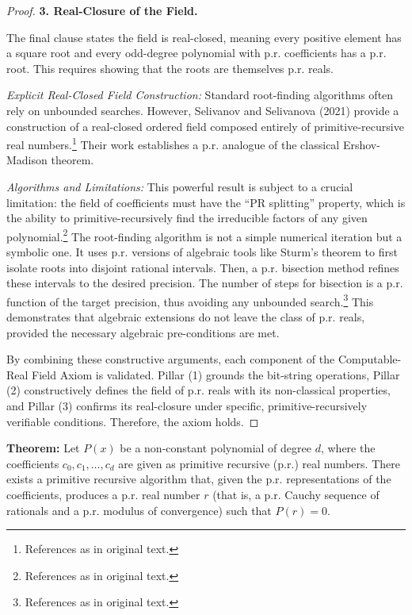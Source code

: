 \documentclass[12pt, a4paper]{article}
\begin{document}
\begin{proof}
\medskip
\noindent \textbf{3. Real-Closure of the Field.}

The final clause states the field is real-closed, meaning every positive element has a square root and every odd-degree polynomial with p.r. coefficients has a p.r. root. This requires showing that the roots are themselves p.r. reals.

\medskip
\noindent \textit{Explicit Real-Closed Field Construction:} Standard root-finding algorithms often rely on unbounded searches. However, Selivanov and Selivanova (2021) provide a construction of a real-closed ordered field composed entirely of primitive-recursive real numbers.\footnote{References as in original text.} Their work establishes a p.r. analogue of the classical Ershov-Madison theorem.

\medskip
\noindent \textit{Algorithms and Limitations:} This powerful result is subject to a crucial limitation: the field of coefficients must have the ``PR splitting'' property, which is the ability to primitive-recursively find the irreducible factors of any given polynomial.\footnote{References as in original text.} The root-finding algorithm is not a simple numerical iteration but a symbolic one. It uses p.r. versions of algebraic tools like Sturm's theorem to first isolate roots into disjoint rational intervals. Then, a p.r. bisection method refines these intervals to the desired precision. The number of steps for bisection is a p.r. function of the target precision, thus avoiding any unbounded search.\footnote{References as in original text.} This demonstrates that algebraic extensions do not leave the class of p.r. reals, provided the necessary algebraic pre-conditions are met.

\medskip
By combining these constructive arguments, each component of the Computable-Real Field Axiom is validated. Pillar (1) grounds the bit-string operations, Pillar (2) constructively defines the field of p.r. reals with its non-classical properties, and Pillar (3) confirms its real-closure under specific, primitive-recursively verifiable conditions. Therefore, the axiom holds.
\end{proof}
\textbf{Theorem:} Let $P(x)$ be a non-constant polynomial of degree $d$, where the coefficients $c_0, c_1, \ldots, c_d$ are given as primitive recursive (p.r.) real numbers. There exists a primitive recursive algorithm that, given the p.r. representations of the coefficients, produces a p.r. real number $r$ (that is, a p.r. Cauchy sequence of rationals and a p.r. modulus of convergence) such that $P(r) = 0$.
\end{document}
